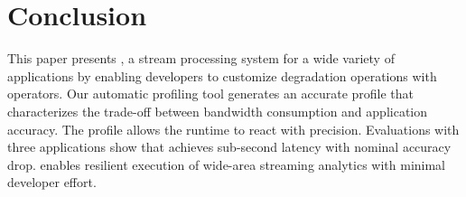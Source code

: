 \section{Conclusion}
\label{sec:conclusion}


This paper presents \sysname{}, a stream processing system for a wide variety of
applications by enabling developers to customize degradation operations with
\maybe{} operators. Our automatic profiling tool generates an accurate profile
that characterizes the trade-off between bandwidth consumption and application
accuracy. The profile allows the runtime to react with precision. Evaluations
with three applications show that \sysname{} achieves sub-second latency with
nominal accuracy drop. \sysname{} enables resilient execution of wide-area
streaming analytics with minimal developer effort.



